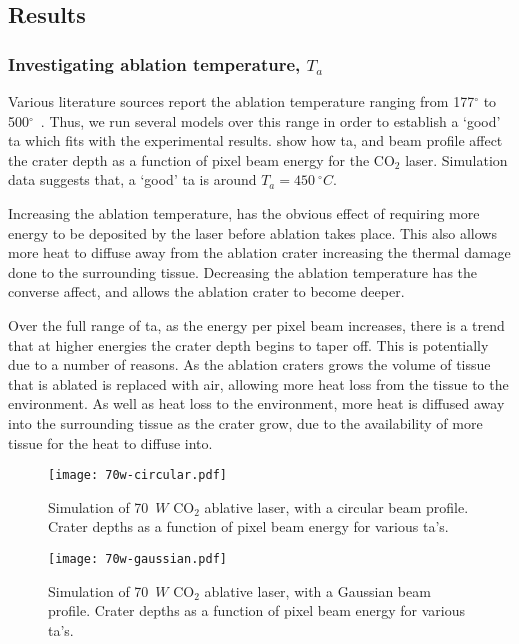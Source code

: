 \subsection{Results}

\subsubsection*{Investigating ablation temperature, \texorpdfstring{$T_a$}{Ta}}

Various literature sources report the ablation temperature ranging from 177$^{\circ}$ to 500$^{\circ}$~\cite{gerstmann1994char,mckenzie1986three,sagi1992heating}. Thus, we run several models over this range in order to establish a `good' \gls{ta} which fits with the experimental results.  show how \gls{ta}, and beam profile affect the crater depth as a function of pixel beam energy for the CO$_2$ laser. Simulation data suggests that, a `good' \gls{ta} is around $T_a=450~^{\circ}C$.

Increasing the ablation temperature, has the obvious effect of requiring more energy to be deposited by the laser before ablation takes place. This also allows more heat to diffuse away from the ablation crater increasing the thermal damage done to the surrounding tissue. Decreasing the ablation temperature has the converse affect, and allows the ablation crater to become deeper.

Over the full range of \gls{ta}, as the energy per pixel beam increases, there is a trend that at higher energies the crater depth begins to taper off. This is potentially due to a number of reasons. As the ablation craters grows the volume of tissue that is ablated is replaced with air, allowing more heat loss from the tissue to the environment. As well as heat loss to the environment, more heat is diffused away into the surrounding tissue as the crater grow, due to the availability of more tissue for the heat to diffuse into.


\begin{figure}
	\centering
    \texttt{[image: 70w-circular.pdf]}
    \caption{Simulation of 70~$W$ CO$_2$ ablative laser, with a circular beam profile. Crater depths as a function of pixel beam energy for various \gls{ta}'s.}
    \label{fig:tacirc}
\end{figure}
 
 \begin{figure}
	\centering
    \texttt{[image: 70w-gaussian.pdf]}
    \caption{Simulation of 70~$W$ CO$_2$ ablative laser, with a Gaussian beam profile. Crater depths as a function of pixel beam energy for various \gls{ta}'s.}
    \label{fig:tagauss}
\end{figure}

